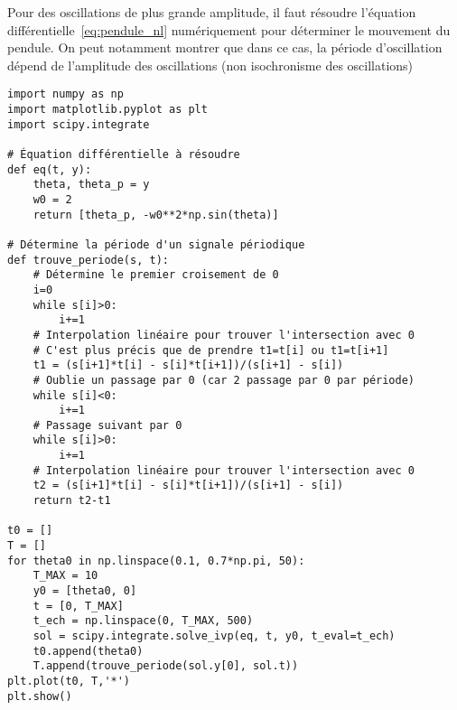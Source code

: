 \documentclass{cours}
\begin{document}
Pour des oscillations de plus grande amplitude, il faut résoudre l'équation différentielle~\ref{eq:pendule_nl} numériquement pour déterminer le mouvement du pendule. On peut notamment montrer que dans ce cas, la période d'oscillation dépend de l'amplitude des oscillations (non isochronisme des oscillations)

\begin{verbatim}
import numpy as np
import matplotlib.pyplot as plt
import scipy.integrate

# Équation différentielle à résoudre
def eq(t, y):
    theta, theta_p = y
    w0 = 2
    return [theta_p, -w0**2*np.sin(theta)]
    
# Détermine la période d'un signale périodique
def trouve_periode(s, t):
    # Détermine le premier croisement de 0
    i=0
    while s[i]>0:
        i+=1
    # Interpolation linéaire pour trouver l'intersection avec 0
    # C'est plus précis que de prendre t1=t[i] ou t1=t[i+1]
    t1 = (s[i+1]*t[i] - s[i]*t[i+1])/(s[i+1] - s[i]) 
    # Oublie un passage par 0 (car 2 passage par 0 par période)
    while s[i]<0:
        i+=1
    # Passage suivant par 0
    while s[i]>0:
        i+=1
    # Interpolation linéaire pour trouver l'intersection avec 0
    t2 = (s[i+1]*t[i] - s[i]*t[i+1])/(s[i+1] - s[i]) 
    return t2-t1

t0 = []
T = []
for theta0 in np.linspace(0.1, 0.7*np.pi, 50):
    T_MAX = 10
    y0 = [theta0, 0]
    t = [0, T_MAX]
    t_ech = np.linspace(0, T_MAX, 500)
    sol = scipy.integrate.solve_ivp(eq, t, y0, t_eval=t_ech)
    t0.append(theta0)
    T.append(trouve_periode(sol.y[0], sol.t))
plt.plot(t0, T,'*')
plt.show()
\end{verbatim}
\end{document}
